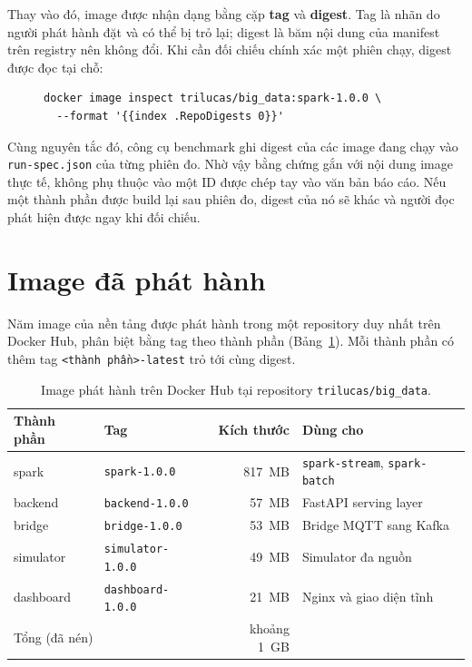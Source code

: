 Thay vào đó, image được nhận dạng bằng cặp \textbf{tag} và \textbf{digest}.
Tag là nhãn do người phát hành đặt và có thể bị trỏ lại; digest là băm nội dung
của manifest trên registry nên không đổi. Khi cần đối chiếu chính xác một phiên
chạy, digest được đọc tại chỗ:

\begin{figure}[H]
\label{lst:digest}
\begin{lstlisting}[basicstyle=\ttfamily\footnotesize,frame=single]
docker image inspect trilucas/big_data:spark-1.0.0 \
  --format '{{index .RepoDigests 0}}'
\end{lstlisting}
\end{figure}

Cùng nguyên tắc đó, công cụ benchmark ghi digest của các image đang chạy vào
\texttt{run-spec.json} của từng phiên đo. Nhờ vậy bằng chứng gắn với nội dung
image thực tế, không phụ thuộc vào một ID được chép tay vào văn bản báo cáo.
Nếu một thành phần được build lại sau phiên đo, digest của nó sẽ khác và người
đọc phát hiện được ngay khi đối chiếu.

\section{Image đã phát hành}

Năm image của nền tảng được phát hành trong một repository duy nhất trên Docker
Hub, phân biệt bằng tag theo thành phần
(Bảng~\ref{tab:hub-images}). Mỗi thành phần có thêm tag
\texttt{<thành phần>-latest} trỏ tới cùng digest.

\begin{table}[H]
\centering
\caption{Image phát hành trên Docker Hub tại repository \texttt{trilucas/big\_data}.}
\label{tab:hub-images}
\small
\begin{tabularx}{\textwidth}{l l r X}
\toprule
\textbf{Thành phần} & \textbf{Tag} & \textbf{Kích thước} & \textbf{Dùng cho} \\
\midrule
spark     & \texttt{spark-1.0.0}     & 817~MB & \texttt{spark-stream}, \texttt{spark-batch} \\
backend   & \texttt{backend-1.0.0}   & 57~MB  & FastAPI serving layer \\
bridge    & \texttt{bridge-1.0.0}    & 53~MB  & Bridge MQTT sang Kafka \\
simulator & \texttt{simulator-1.0.0} & 49~MB  & Simulator đa nguồn \\
dashboard & \texttt{dashboard-1.0.0} & 21~MB  & Nginx và giao diện tĩnh \\
\midrule
\multicolumn{2}{l}{Tổng (đã nén)} & khoảng 1~GB & \\
\bottomrule
\end{tabularx}
\end{table}

